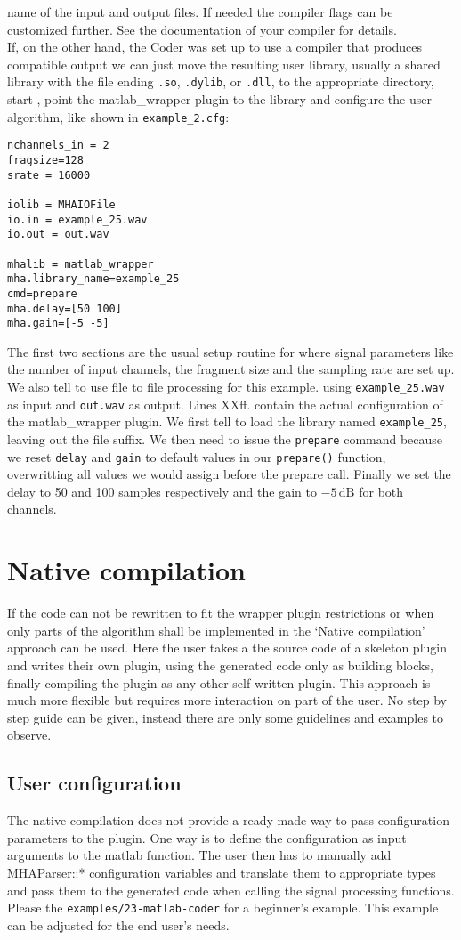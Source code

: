 \documentclass[11pt,a4paper,twoside]{article}
\newcommand{\+}{\discretionary{\mbox{\scriptsize$\hookleftarrow$}}{}{}}
\begin{document}
name of the input and output files. If needed the compiler flags can be customized further.
See the documentation of your compiler for details. \\
If, on the other hand, the \Matlab{} Coder was set up to use a compiler that produces \mha{} compatible
output we can just move the resulting user library, usually a shared library with the file ending
\texttt{.so}, \texttt{.dylib}, or \texttt{.dll}, to the appropriate directory, start \mha{},
point the matlab\_wrapper plugin to the library and configure the user
algorithm, like shown in \texttt{example\_2.cfg}:
\begin{lstlisting}
nchannels_in = 2
fragsize=128
srate = 16000

iolib = MHAIOFile
io.in = example_25.wav
io.out = out.wav

mhalib = matlab_wrapper
mha.library_name=example_25
cmd=prepare
mha.delay=[50 100]
mha.gain=[-5 -5]
\end{lstlisting}
The first two sections are the usual setup routine for \mha{} where signal
parameters like the number of input channels, the fragment size and the sampling
rate are set up. We also tell \mha{} to use file to file processing for this
example. using \texttt{example\_25.wav} as input and \texttt{out.wav} as output.
Lines XXff. contain the actual configuration of the matlab\_wrapper plugin. We
first tell \mha{} to load the library named \texttt{example\_25}, leaving out the
file suffix. We then need to issue the \texttt{prepare} command because we reset
\texttt{delay} and \texttt{gain} to default values in our \texttt{prepare()}
function, overwritting all values we would assign before the prepare call.
Finally we set the delay to 50 and 100 samples respectively and the
gain to $-5\,\mathrm{dB}$ for both channels.

\section{Native compilation}\label{sec:native compilation}
If the code can not be rewritten to fit the wrapper plugin restrictions or when
only parts of the algorithm shall be implemented in \Matlab{} the `Native
compilation' approach can be used.
Here the user takes a the source code of a skeleton \mha{} plugin and writes
their own plugin, using the generated code only as building blocks,
finally compiling the plugin as any other self written \mha{} plugin.
This approach is much more flexible but requires more interaction
on part of the user. No step by step guide can be given, instead there are only
some guidelines and examples to observe. 
\subsection{User configuration}
The native compilation does not provide a ready made way to pass configuration parameters to the plugin.
One way is to define the configuration as input arguments to the matlab function.
The user then has to manually add MHAParser::* configuration variables and translate them to appropriate types and
pass them to the generated code when calling the signal processing functions.
Please the \texttt{examples/23-matlab-coder} for a beginner's example. This
example can be adjusted for the end user's needs.
\end{document}
